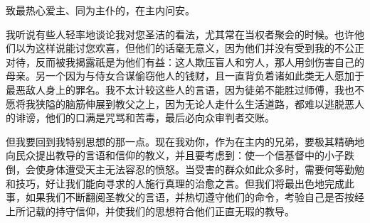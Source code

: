 致最热心爱主、同为主仆的，在主内问安。\par

我听说有些人轻率地谈论我对您圣洁的看法，尤其常在当权者聚会的时候。也许他们以为这样说能讨您欢喜，但他们的话毫无意义，因为他们并没有受到我的不公正对待，反而被我揭露祇是为他们有益：这人欺压盲人和穷人，那人用剑伤害自己的母亲。另一个因为与侍女合谋偷窃他人的钱财，且一直背负着诸如此类无人愿加于最恶敌人身上的罪名。我不太计较这些人的言语，因为徒弟不能胜过师傅，我也不愿将我狭隘的脑筋伸展到教父之上，因为无论人走什么生活道路，都难以逃脱恶人的诽谤，他们的口满是咒骂和苦毒，最后必向众审判者交账。\par

但我要回到我特别思想的那一点。现在我劝你，作为在主内的兄弟，要极其精确地向民众提出教导的言语和信仰的教义，并且要考虑到：使一个信基督中的小子跌倒，会使身体遭受天主无法容忍的愤怒。当受害的群众如此众多时，需要何等勤勉和技巧，好让我们能向寻求的人施行真理的治愈之言。但我们将最出色地完成此事，如果我们不断翻阅圣教父的言语，并热切遵守他们的命令，考验自己是否按经上所记载的持守信仰，并使我们的思想符合他们正直无瑕的教导。\par

